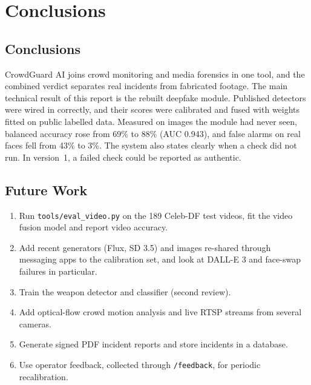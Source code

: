 \documentclass[12pt,a4paper,oneside]{report}
\begin{document}
\chapter{Conclusions}

\section{Conclusions}
CrowdGuard AI joins crowd monitoring and media forensics in one tool, and the combined verdict separates real incidents from fabricated footage. The main technical result of this report is the rebuilt deepfake module. Published detectors were wired in correctly, and their scores were calibrated and fused with weights fitted on public labelled data. Measured on images the module had never seen, balanced accuracy rose from 69\% to 88\% (AUC 0.943), and false alarms on real faces fell from 43\% to 3\%. The system also states clearly when a check did not run. In version~1, a failed check could be reported as authentic.

\section{Future Work}
\begin{enumerate}
  \item Run \texttt{tools/eval\_video.py} on the 189 Celeb-DF test videos, fit the video fusion model and report video accuracy.
  \item Add recent generators (Flux, SD 3.5) and images re-shared through messaging apps to the calibration set, and look at DALL-E 3 and face-swap failures in particular.
  \item Train the weapon detector and classifier (second review).
  \item Add optical-flow crowd motion analysis and live RTSP streams from several cameras.
  \item Generate signed PDF incident reports and store incidents in a database.
  \item Use operator feedback, collected through \texttt{/feedback}, for periodic recalibration.
\end{enumerate}
\end{document}
